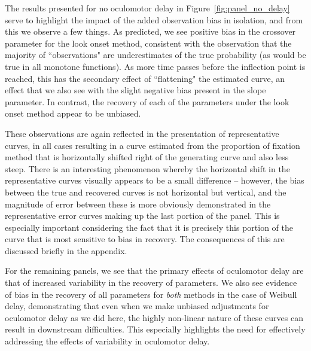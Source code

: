 \documentclass{article}
\begin{document}
The results presented for no oculomotor delay in Figure~\ref{fig:panel_no_delay} serve to highlight the impact of the added observation bias in isolation, and from this we observe a few things. As predicted, we see positive bias in the crossover parameter for the look onset method, consistent with the observation that the majority of ``observations" are underestimates of the true probability (as would be true in all monotone functions). As more time passes before the inflection point is reached, this has the secondary effect of ``flattening" the estimated curve, an effect that we also see with the slight negative bias present in the slope parameter. In contrast, the recovery of each of the parameters under the look onset method appear to be unbiased.

These observations are again reflected in the presentation of representative curves, in all cases resulting in a curve estimated from the proportion of fixation method that is horizontally shifted right of the generating curve and also less steep. There is an interesting phenomenon whereby the horizontal shift in the representative curves visually appears to be a small difference -- however, the bias between the true and recovered curves is not horizontal but vertical, and the magnitude of error between these is more obviously demonstrated in the representative error curves making up the last portion of the panel. This is especially important considering the fact that it is precisely this portion of the curve that is most sensitive to bias in recovery. The consequences of this are discussed briefly in the appendix. 

For the remaining panels, we see that the primary effects of oculomotor delay are that of increased variability in the recovery of parameters. We also see evidence of bias in the recovery of all parameters for \textit{both} methods in the case of Weibull delay, demonstrating that even when we make unbiased adjustments for oculomotor delay as we did here, the highly non-linear nature of these curves can result in downstream difficulties. This especially highlights the need for effectively addressing the effects of variability in oculomotor delay.
\end{document}
